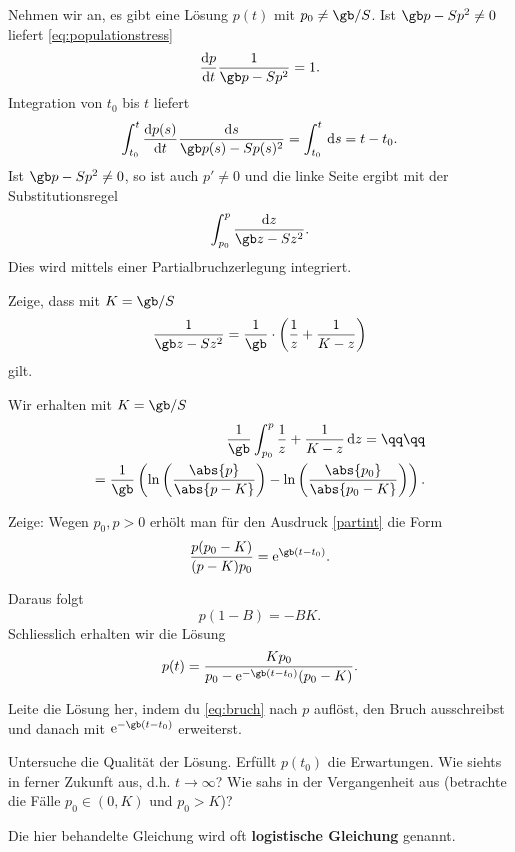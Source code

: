 \documentclass[%
draft,
11pt,%
twoside,%
titlepage,%
german,%
headsepline%
]{scrartcl}
\begin{document}
Nehmen wir an, es gibt eine L\"osung $p(t)$ mit $p_0\neq\gb/S$. Ist $\gb p-Sp^2\neq0$ liefert \eqref{eq:populationstress}
$$\frac{\mathrm{d}p}{\mathrm{d}t}\frac{1}{\gb p-Sp^2}=1.$$
Integration von $t_0$ bis $t$ liefert
$$\int_{t_0}^t\frac{\mathrm{d}p(s)}{\mathrm{d}t}\frac{\mathrm{d}s}{\gb p(s)-Sp(s)^2}=\int_{t_0}^t\,\mathrm{d}s=t-t_0.$$
Ist $\gb p-Sp^2\neq0$, so ist auch $p'\neq0$ und die linke Seite ergibt mit der Substitutionsregel
$$\int_{p_0}^p\frac{\mathrm{d}z}{\gb z-Sz^2}.$$
Dies wird mittels einer Partialbruchzerlegung integriert.
\begin{ueb}
Zeige, dass mit $K=\gb/S$
$$\frac{1}{\gb z-Sz^2}=\frac{1}{\gb}\cdot\left(\frac{1}{z}+\frac{1}{K-z}\right)$$
gilt.
\end{ueb}
\noindent Wir erhalten mit $K=\gb/S$
\begin{equation}\label{partint}
\begin{split}
\frac{1}{\gb}\int_{p_0}^p\frac{1}{z}+\frac{1}{K-z}\,\mathrm{d}z=\qq\qq\\
=\frac{1}{\gb}\left(\ln\left(\frac{\abs{p}}{\abs{p-K}}\right)-\ln\left(\frac{\abs{p_0}}{\abs{p_0-K}}\right)\right).
\end{split}
\end{equation}
\begin{ueb}
Zeige: Wegen $p_0,p>0$ erh\"olt man f\"ur den Ausdruck \eqref{partint} die Form
$$\frac{p(p_0-K)}{(p-K)p_0}=\mathrm{e}^{\gb(t-t_0)}.$$
\end{ueb}
\noindent Daraus folgt
\begin{equation}\label{eq:bruch}
p(1-B)=-BK.
\end{equation}
Schliesslich erhalten wir die L\"osung
$$p(t)=\frac{Kp_0}{p_0-\mathrm{e}^{-\gb(t-t_0)}(p_0-K)}.$$

\begin{ueb}
Leite die L\"osung her, indem du \eqref{eq:bruch} nach $p$ aufl\"ost, den Bruch ausschreibst und danach mit $\mathrm{e}^{-\gb(t-t_0)}$ erweiterst.
\end{ueb}

\begin{ueb}
Untersuche die Qualit\"at der L\"osung. Erf\"ullt $p(t_0)$ die Erwartungen. Wie siehts in ferner Zukunft aus, d.h. $t\to\infty$? Wie sahs in der Vergangenheit aus (betrachte die F\"alle $p_0\in(0,K)$ und $p_0>K$)?
\end{ueb}

\begin{bem}
Die hier behandelte Gleichung wird oft \textbf{logistische Gleichung} genannt.
\end{bem}
\end{document}

